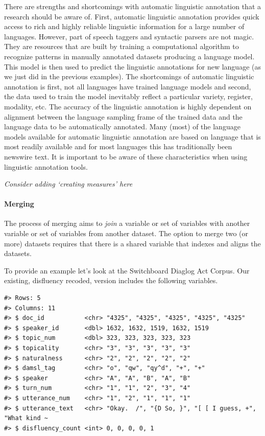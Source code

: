 \documentclass[
]{article}
\begin{document}
There are strengths and shortcomings with automatic linguistic annotation that a research should be aware of. First, automatic linguistic annotation provides quick access to rich and highly reliable linguistic information for a large number of languages. However, part of speech taggers and syntactic parsers are not magic. They are resources that are built by training a computational algorithm to recognize patterns in manually annotated datasets producing a language model. This model is then used to predict the linguistic annotations for new language (as we just did in the previous examples). The shortcomings of automatic linguistic annotation is first, not all languages have trained language models and second, the data used to train the model inevitably reflect a particular variety, register, modality, etc. The accuracy of the linguistic annotation is highly dependent on alignment between the language sampling frame of the trained data and the language data to be automatically annotated. Many (most) of the language models available for automatic linguistic annotation are based on language that is most readily available and for most languages this has traditionally been newswire text. It is important to be aware of these characteristics when using linguistic annotation tools.

\emph{Consider adding `creating measures' here}

\hypertarget{merging}{%
\paragraph{Merging}\label{merging}}

The process of merging aims to \emph{join} a variable or set of variables with another variable or set of variables from another dataset. The option to merge two (or more) datasets requires that there is a shared variable that indexes and aligns the datasets.

To provide an example let's look at the Switchboard Diaglog Act Corpus. Our existing, disfluency recoded, version includes the following variables.

\begin{verbatim}
#> Rows: 5
#> Columns: 11
#> $ doc_id           <chr> "4325", "4325", "4325", "4325", "4325"
#> $ speaker_id       <dbl> 1632, 1632, 1519, 1632, 1519
#> $ topic_num        <dbl> 323, 323, 323, 323, 323
#> $ topicality       <chr> "3", "3", "3", "3", "3"
#> $ naturalness      <chr> "2", "2", "2", "2", "2"
#> $ damsl_tag        <chr> "o", "qw", "qy^d", "+", "+"
#> $ speaker          <chr> "A", "A", "B", "A", "B"
#> $ turn_num         <chr> "1", "1", "2", "3", "4"
#> $ utterance_num    <chr> "1", "2", "1", "1", "1"
#> $ utterance_text   <chr> "Okay.  /", "{D So, }", "[ [ I guess, +", "What kind ~
#> $ disfluency_count <int> 0, 0, 0, 0, 1
\end{verbatim}
\end{document}
